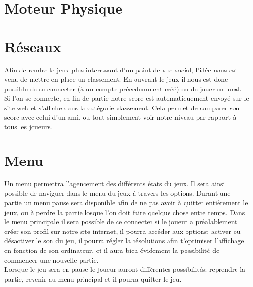 \documentclass [11pt]{report}
\begin{document}
\newpage

	\section {Moteur Physique}


	\section {Réseaux}
	Afin de rendre le jeux plus interessant d'un point de vue social, l'idée nous est venu de mettre en place un classement. En ouvrant le jeux il nous est donc possible de se connecter (à un compte précedemment créé) ou de jouer en local. Si l'on se connecte, en fin de partie notre score est automatiquement envoyé sur le site web et s'affiche dans la catégorie classement. Cela permet de comparer son score avec celui d'un ami, ou tout simplement voir notre niveau par rapport à tous les joueurs.\\\vspace{5mm}


	\section {Menu}
	Un menu permettra l'agencement des différents états du jeux. Il sera ainsi possible de naviguer dans le menu du jeux à travers les options. Durant une partie un menu pause sera disponible afin de ne pas avoir à quitter entièrement le jeux, ou à perdre la partie losque l'on doit faire quelque chose entre temps. Dans le menu principale il sera possible de ce connecter si le joueur a préalablement créer son profil sur notre site internet, il pourra accéder aux options: activer ou désactiver le son du jeu, il pourra régler la résolutions afin t'optimiser l'affichage en fonction de son ordinateur, et il aura bien évidement la possibilité de commencer une nouvelle partie. \\
Lorsque le jeu sera en pause le joueur auront différentes possibilités: reprendre la partie, revenir au menu principal et il pourra quitter le jeu.\\\vspace{5mm}
\end{document}
